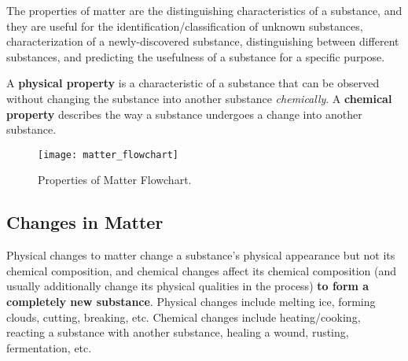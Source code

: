 The properties of matter are the distinguishing characteristics of a substance, and they are useful for the identification/classification of unknown substances, characterization of a newly-discovered substance, distinguishing between different substances, and predicting the usefulness of a substance for a specific purpose. \\

\noindent
{}

\begin{defn}
A \textbf{physical property} is a characteristic of a substance that can be observed without changing the substance into another substance \textit{chemically}. A \textbf{chemical property}  describes the way a substance undergoes a change into another substance.
\end{defn}

\begin{figure}[H]
	\centering
	\texttt{[image: matter\_flowchart]}
	\caption{Properties of Matter Flowchart. }
\end{figure}

\subsection{Changes in Matter}

Physical changes to matter change a substance's physical appearance but not its chemical composition, and chemical changes affect its chemical composition (and usually additionally change its physical qualities in the process) \textbf{to form a completely new substance}. Physical changes include melting ice, forming clouds, cutting, breaking, etc. Chemical changes include heating/cooking, reacting a substance with another substance, healing a wound, rusting, fermentation, etc. \\

\noindent
{} \\

\noindent
{}

